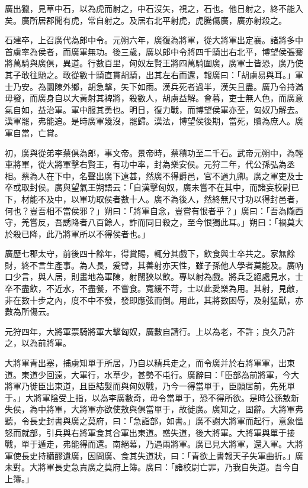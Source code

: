 \begin{pinyinscope}
廣出獵，見草中石，以為虎而射之，中石沒矢，視之，石也。他日射之，終不能入矣。廣所居郡聞有虎，常自射之。及居右北平射虎，虎騰傷廣，廣亦射殺之。

石建卒，上召廣代為郎中令。元朔六年，廣復為將軍，從大將軍出定襄。諸將多中首虜率為侯者，而廣軍無功。後三歲，廣以郎中令將四千騎出右北平，博望侯張騫將萬騎與廣俱，異道。行數百里，匈奴左賢王將四萬騎圍廣，廣軍士皆恐，廣乃使其子敢往馳之。敢從數十騎直貫胡騎，出其左右而還，報廣曰：「胡虜易與耳。」軍士乃安。為圜陳外鄉，胡急擊，矢下如雨。漢兵死者過半，漢矢且盡。廣乃令持滿毋發，而廣身自以大黃射其裨將，殺數人，胡虜益解。會暮，吏士無人色，而廣意氣自如，益治軍。軍中服其勇也。明日，復力戰，而博望侯軍亦至，匈奴乃解去。漢軍罷，弗能追。是時廣軍幾沒，罷歸。漢法，博望侯後期，當死，贖為庶人。廣軍自當，亡賞。

初，廣與從弟李蔡俱為郎，事文帝。景帝時，蔡積功至二千石。武帝元朔中，為輕車將軍，從大將軍擊右賢王，有功中率，封為樂安侯。元狩二年，代公孫弘為丞相。蔡為人在下中，名聲出廣下遠甚，然廣不得爵邑，官不過九卿。廣之軍吏及士卒或取封侯。廣與望氣王朔語云：「自漢擊匈奴，廣未嘗不在其中，而諸妄校尉已下，材能不及中，以軍功取侯者數十人。廣不為後人，然終無尺寸功以得封邑者，何也？豈吾相不當侯邪？」朔曰：「將軍自念，豈嘗有恨者乎？」廣曰：「吾為隴西守，羌嘗反，吾誘降者八百餘人，詐而同日殺之，至今恨獨此耳。」朔曰：「禍莫大於殺已降，此乃將軍所以不得侯者也。」

廣歷七郡太守，前後四十餘年，得賞賜，輒分其戲下，飲食與士卒共之。家無餘財，終不言生產事。為人長，爰臂，其善射亦天性，雖子孫他人學者莫能及。廣吶口少言，與人居，則畫地為軍陳，射闊狹以飲。專以射為戲。將兵乏絕處見水，士卒不盡飲，不近水，不盡餐，不嘗食。寬緩不苛，士以此愛樂為用。其射，見敵，非在數十步之內，度不中不發，發即應弦而倒。用此，其將數困辱，及射猛獸，亦數為所傷云。

元狩四年，大將軍票騎將軍大擊匈奴，廣數自請行。上以為老，不許；良久乃許之，以為前將軍。

大將軍青出塞，捕虜知單于所居，乃自以精兵走之，而令廣并於右將軍軍，出東道。東道少回遠，大軍行，水草少，甚勢不屯行。廣辭曰：「臣部為前將軍，今大將軍乃徙臣出東道，且臣結髮而與匈奴戰，乃今一得當單于，臣願居前，先死單于。」大將軍陰受上指，以為李廣數奇，毋令當單于，恐不得所欲。是時公孫敖新失侯，為中將軍，大將軍亦欲使敖與俱當單于，故徙廣。廣知之，固辭。大將軍弗聽，令長史封書與廣之莫府，曰：「急詣部，如書。」廣不謝大將軍而起行，意象慍怒而就部，引兵與右將軍食其合軍出東道。惑失道，後大將軍。大將軍與單于接戰，單于遁走，弗能得而還。南絕幕，乃遇兩將軍。廣已見大將軍，還入軍。大將軍使長史持糒醪遺廣，因問廣、食其失道狀，曰：「青欲上書報天子失軍曲折。」廣未對。大將軍長史急責廣之莫府上簿。廣曰：「諸校尉亡罪，乃我自失道。吾今自上簿。」


\end{pinyinscope}
